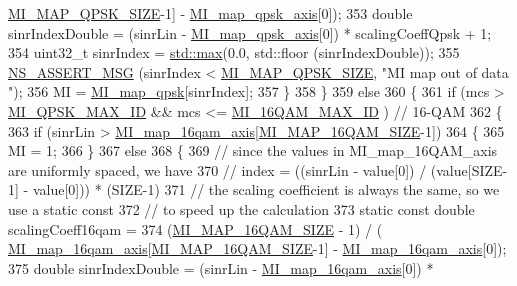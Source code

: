 \begin{DoxyCode}
      \hyperlink{namespacens3_aae59b755610c3c0be0b839e4dcc933d6}{MI\_MAP\_QPSK\_SIZE}-1] - \hyperlink{namespacens3_a8170078bba1537f2165fdd97e9a49d0f}{MI\_map\_qpsk\_axis}[0]);
353               \textcolor{keywordtype}{double} sinrIndexDouble = (sinrLin -  \hyperlink{namespacens3_a8170078bba1537f2165fdd97e9a49d0f}{MI\_map\_qpsk\_axis}[0]) * scalingCoeffQpsk 
      + 1;
354               uint32\_t sinrIndex = \hyperlink{80211b_8c_affe776513b24d84b39af8ab0930fef7f}{std::max}(0.0, std::floor (sinrIndexDouble));
355               \hyperlink{assert_8h_aff5ece9066c74e681e74999856f08539}{NS\_ASSERT\_MSG} (sinrIndex < \hyperlink{namespacens3_aae59b755610c3c0be0b839e4dcc933d6}{MI\_MAP\_QPSK\_SIZE}, \textcolor{stringliteral}{"MI map out of data
      "});
356               MI = \hyperlink{namespacens3_a033a4853fbafa2f0685cfc40fafedac1}{MI\_map\_qpsk}[sinrIndex];
357             \}
358         \}
359       \textcolor{keywordflow}{else}
360         \{
361           \textcolor{keywordflow}{if} (mcs > \hyperlink{namespacens3_a1840b801e1da3fdf41acd19d0d69b364}{MI\_QPSK\_MAX\_ID} && mcs <= \hyperlink{namespacens3_ae747a3e135187138f53f61a9cbc17bb0}{MI\_16QAM\_MAX\_ID} )     \textcolor{comment}{// 16-QAM}
362             \{
363               \textcolor{keywordflow}{if} (sinrLin > \hyperlink{namespacens3_a57654bbd0e78a79e8e20a7af14abe6c4}{MI\_map\_16qam\_axis}[\hyperlink{namespacens3_a9afdb721d53db6fa713ad6255ba2be6f}{MI\_MAP\_16QAM\_SIZE}-1])
364                 \{
365                   MI = 1;
366                 \}
367               \textcolor{keywordflow}{else} 
368                 \{
369                   \textcolor{comment}{// since the values in MI\_map\_16QAM\_axis are uniformly spaced, we have}
370                   \textcolor{comment}{// index = ((sinrLin - value[0]) / (value[SIZE-1] - value[0])) * (SIZE-1)}
371                   \textcolor{comment}{// the scaling coefficient is always the same, so we use a static const}
372                   \textcolor{comment}{// to speed up the calculation}
373                   \textcolor{keyword}{static} \textcolor{keyword}{const} \textcolor{keywordtype}{double} scalingCoeff16qam = 
374                     (\hyperlink{namespacens3_a9afdb721d53db6fa713ad6255ba2be6f}{MI\_MAP\_16QAM\_SIZE} - 1) / (
      \hyperlink{namespacens3_a57654bbd0e78a79e8e20a7af14abe6c4}{MI\_map\_16qam\_axis}[\hyperlink{namespacens3_a9afdb721d53db6fa713ad6255ba2be6f}{MI\_MAP\_16QAM\_SIZE}-1] - 
      \hyperlink{namespacens3_a57654bbd0e78a79e8e20a7af14abe6c4}{MI\_map\_16qam\_axis}[0]);
375                   \textcolor{keywordtype}{double} sinrIndexDouble = (sinrLin -  \hyperlink{namespacens3_a57654bbd0e78a79e8e20a7af14abe6c4}{MI\_map\_16qam\_axis}[0]) * 

\end{DoxyCode}
